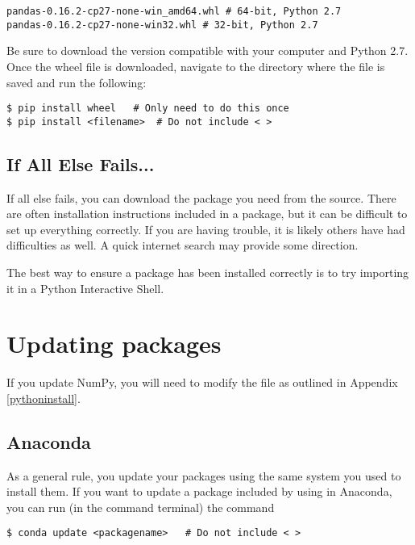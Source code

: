 \begin{lstlisting}
pandas-0.16.2-cp27-none-win_amd64.whl # 64-bit, Python 2.7
pandas-0.16.2-cp27-none-win32.whl # 32-bit, Python 2.7
\end{lstlisting}

Be sure to download the version compatible with your computer and Python 2.7. Once the wheel file is downloaded, navigate to the directory where the file is saved and run the following:

\begin{lstlisting}
$ pip install wheel   # Only need to do this once
$ pip install <filename>  # Do not include < >
\end{lstlisting}

\subsection*{If All Else Fails...}
If all else fails, you can download the package you need from the source. There are often installation instructions included in a package, but it can be difficult to set up everything correctly. If you are having trouble, it is likely others have had difficulties as well. A quick internet search may provide some direction.

\begin{info}
The best way to ensure a package has been installed correctly is to try importing it in a Python Interactive Shell.
\end{info}

\section*{Updating packages}

\begin{info}
If you update NumPy, you will need to modify the file  as outlined in Appendix \ref{pythoninstall}.
\end{info}

\subsection*{Anaconda}
As a general rule, you update your packages using the same system you used to install them.
If you want to update a package included by using in Anaconda, you can run (in the command terminal) the command
\begin{lstlisting}
$ conda update <packagename>   # Do not include < >
\end{lstlisting}

